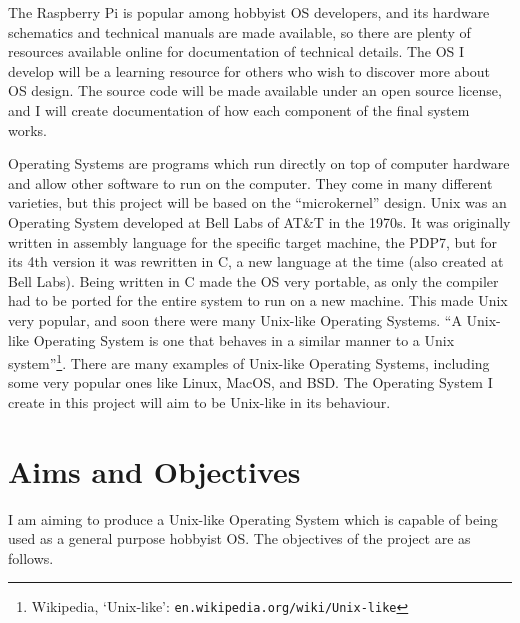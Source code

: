 \documentclass{article}
\begin{document}
The Raspberry Pi is popular among hobbyist OS developers, and its hardware
schematics and technical manuals are made available, so there are plenty of
resources available online for documentation of technical details. The OS I
develop will be a learning resource for others who wish to discover more about
OS design. The source code will be made available under an open source license,
and I will create documentation of how each component of the final system
works.

Operating Systems are programs which run directly on top of computer hardware
and allow other software to run on the computer. They come in many different
varieties, but this project will be based on the ``microkernel'' design. Unix
was an Operating System developed at Bell Labs of AT\&T in the 1970s. It was
originally written in assembly language for the specific target machine, the
PDP7, but for its 4th version it was rewritten in C, a new language at the time
(also created at Bell Labs). Being written in C made the OS very portable, as
only the compiler had to be ported for the entire system to run on a new
machine. This made Unix very popular, and soon there were many Unix-like
Operating Systems. ``A Unix-like Operating System is one that behaves in a
similar manner to a Unix system''\footnote{Wikipedia, `Unix-like':
\texttt{en.wikipedia.org/wiki/Unix-like}}. There are many examples of Unix-like
Operating Systems, including some very popular ones like Linux, MacOS, and BSD.
The Operating System I create in this project will aim to be Unix-like in its
behaviour.

\section{Aims and Objectives}
I am aiming to produce a Unix-like Operating System which is capable of being
used as a general purpose hobbyist OS. The objectives of the project are as
follows.
\end{document}
